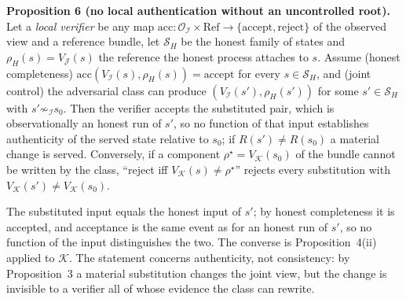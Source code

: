 \documentclass[10pt,journal,compsoc]{IEEEtran}
\begin{document}
\textbf{Proposition 6 (no local authentication without an uncontrolled
root).} Let a \emph{local verifier} be any map
$\mathrm{acc}:\mathcal O_{\mathcal I}\times\mathrm{Ref}\to\{\text{accept},\text{reject}\}$
of the observed view and a reference bundle, let $\mathcal S_H$ be the honest
family of states and $\rho_H(s)=V_{\mathcal J}(s)$ the reference the honest
process attaches to $s$. Assume (honest completeness)
$\mathrm{acc}(V_{\mathcal I}(s),\rho_H(s))=\text{accept}$ for every
$s\in\mathcal S_H$, and (joint control) the adversarial class can produce
$(V_{\mathcal I}(s'),\rho_H(s'))$ for some $s'\in\mathcal S_H$ with
$s'\not\sim_{\mathcal I}s_0$. Then the verifier accepts the substituted pair,
which is observationally an honest run of $s'$, so no function of that input
establishes authenticity of the served state relative to $s_0$; if
$R(s')\ne R(s_0)$ a material change is served. Conversely, if a component
$\rho^{\star}=V_{\mathcal K}(s_0)$ of the bundle cannot be written by the
class, ``reject iff $V_{\mathcal K}(s)\ne\rho^{\star}$'' rejects every
substitution with $V_{\mathcal K}(s')\ne V_{\mathcal K}(s_0)$.

\begin{IEEEproof}
The substituted input equals the honest input of $s'$; by honest completeness
it is accepted, and acceptance is the same event as for an honest run of
$s'$, so no function of the input distinguishes the two. The converse is
Proposition~4(ii) applied to $\mathcal K$. The statement concerns
authenticity, not consistency: by Proposition~3 a material substitution
changes the joint view, but the change is invisible to a verifier all of
whose evidence the class can rewrite.
\end{IEEEproof}
\end{document}
